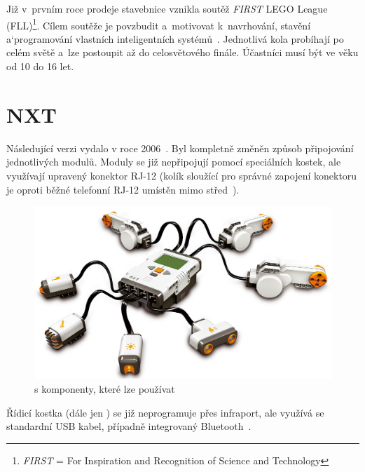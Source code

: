 Již v~prvním roce prodeje stavebnice vznikla soutěž {\it FIRST} LEGO League (FLL)\footnote{{\it FIRST} = For Inspiration and Recognition of Science and Technology}. 
Cílem soutěže je povzbudit a~motivovat k~navrhování, stavění a`programování vlastních inteligentních systémů~\cite{lego_FLL-about}. 
Jednotlivá kola probíhají po celém světě a~lze postoupit až do celosvětového finále. %
Účastníci musí být ve věku od 10 do 16 let. 

\section{\legoM{ }NXT}

Následující verzi vydalo \lego{ }v roce 2006~\cite{lego_mindstormsHistory}. 
Byl kompletně změněn způsob připojování jednotlivých modulů. 
Moduly se již nepřipojují pomocí speciálních \lego{ }kostek, ale využívají upravený konektor RJ-12 %
(kolík sloužící pro správné zapojení konektoru je oproti běžné telefonní RJ-12 umístěn mimo střed~\cite{legoMindstorms_rj12-connector}). %

\begin{figure}[h]
	\centering
	\includegraphics[width=\textwidth]{images/lego-mindstorms-nxt_with-modules.jpg}
	\caption[\legoNXT{ }s komponenty, které lze používat]{\legoNXT{ }s komponenty, které lze používat\protect\footnotemark}
	\label{fig:lego-mindstorms-nxt_with-modules}
\end{figure}

Řídicí kostka (dále jen \brick{}) %
se již neprogramuje přes infraport, ale využívá se standardní USB kabel, případně integrovaný Bluetooth~\cite{legoMindstormsNXT_hardware}.

